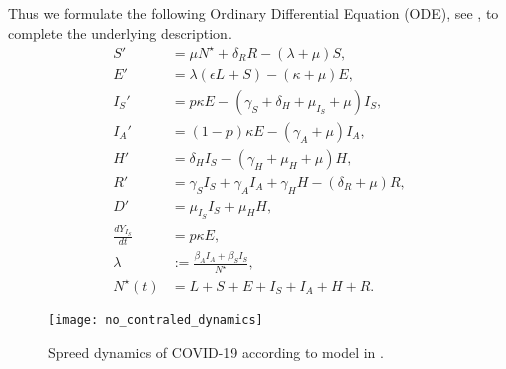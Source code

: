 Thus we formulate the following Ordinary Differential Equation (ODE), see
, to complete the underlying description.
\begin{equation}
	\label{eqn:base_dynamics}
    \begin{aligned}
        S' & =
            \mu N^\star + \delta_R R - (\lambda + \mu)
            S,
        \\
        E' & =
            \lambda (\epsilon L + S) - (\kappa + \mu) E,
        \\
        I_S' & =
            p \kappa E -
            (\gamma_S +
                \delta_H +
                \mu_{I_S} +
                \mu) I_S,
        \\
        I_A' &=
            (1 - p) \kappa E - (\gamma_A + \mu) I_A,
        \\
        H' &=
            \delta_H I_S - (\gamma_H + \mu_H + \mu) H,
        \\
        R' & =
            \gamma_S I_S + \gamma_A I_A + \gamma_H H - (\delta_R + \mu) R,
        \\
        D' &=
            \mu_{I_S} I_S + \mu_H H,
        \\
        \frac{dY_{I_S}}{dt} &  = p \kappa E,
        \\
        \lambda &:=
            \frac{\beta_A I_A + \beta_S I_S}{N^{\star}},
        \\
        N^{\star}(t) &=
            L + S + E +
            I_S + I_A +
            H + R .
    \end{aligned}
\end{equation}
%
\begin{figure}
    \begin{center}
        \texttt{[image: no\_contraled\_dynamics]}
    \end{center}
    \caption{
        Spreed dynamics of COVID-19 according to model in
        .
    }
    \label{fig:base_dynamics}
\end{figure}


